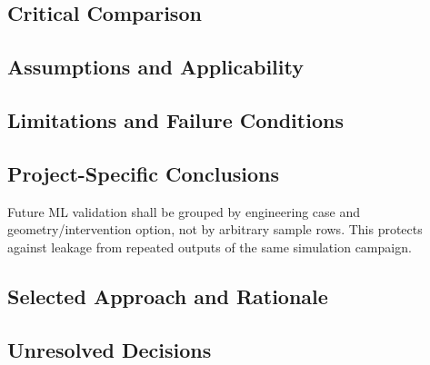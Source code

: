 \subsection{Critical Comparison}
\label{sec:res-ml-trn-critical-comparison}


\subsection{Assumptions and Applicability}
\label{sec:res-ml-trn-assumptions}


\subsection{Limitations and Failure Conditions}
\label{sec:res-ml-trn-limitations}


\subsection{Project-Specific Conclusions}
\label{sec:res-ml-trn-conclusions}

Future ML validation shall be grouped by engineering case and
geometry/intervention option, not by arbitrary sample rows. This
protects against leakage from repeated outputs of the same simulation
campaign.

\subsection{Selected Approach and Rationale}
\label{sec:res-ml-trn-selected-approach}


\subsection{Unresolved Decisions}
\label{sec:res-ml-trn-unresolved-decisions}


